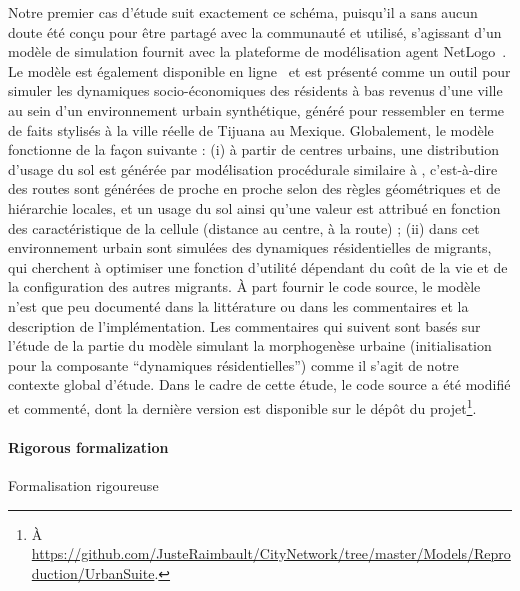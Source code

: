 {Notre premier cas d'étude suit exactement ce schéma, puisqu'il a sans aucun doute été conçu pour être partagé avec la communauté et utilisé, s'agissant d'un modèle de simulation fournit avec la plateforme de modélisation agent NetLogo~\cite{wilensky1999netlogo}. Le modèle est également disponible en ligne~\cite{de2007netlogo} et est présenté comme un outil pour simuler les dynamiques socio-économiques des résidents à bas revenus d'une ville au sein d'un environnement urbain synthétique, généré pour ressembler en terme de faits stylisés à la ville réelle de Tijuana au Mexique. Globalement, le modèle fonctionne de la façon suivante : (i) à partir de centres urbains, une distribution d'usage du sol est générée par modélisation procédurale similaire à \cite{lechner2006procedural}, c'est-à-dire des routes sont générées de proche en proche selon des règles géométriques et de hiérarchie locales, et un usage du sol ainsi qu'une valeur est attribué en fonction des caractéristique de la cellule (distance au centre, à la route) ; (ii) dans cet environnement urbain sont simulées des dynamiques résidentielles de migrants, qui cherchent à optimiser une fonction d'utilité dépendant du coût de la vie et de la configuration des autres migrants. À part fournir le code source, le modèle n'est que peu documenté dans la littérature ou dans les commentaires et la description de l'implémentation. Les commentaires qui suivent sont basés sur l'étude de la partie du modèle simulant la morphogenèse urbaine (initialisation pour la composante ``dynamiques résidentielles'') comme il s'agit de notre contexte global d'étude. Dans le cadre de cette étude, le code source a été modifié et commenté, dont la dernière version est disponible sur le dépôt du projet\footnote{À \url{https://github.com/JusteRaimbault/CityNetwork/tree/master/Models/Reproduction/UrbanSuite}.}.
}



\paragraph{Rigorous formalization}{Formalisation rigoureuse}


